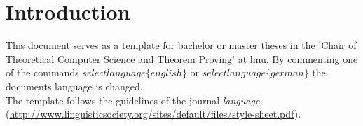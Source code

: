 \documentclass[12pt,letterpaper]{article} %
\begin{document}

\begin{center}
\begin{large}
{}
{}
\end{large}
\end{center}

\vspace{1,5cm}



\newpage
\tableofcontents
\newpage

\setcounter{page}{1}
\pagestyle{fancy}
\fancyhf{}
\fancyhead[R]{\thepage}
\renewcommand{\headrulewidth}{0pt} %

\section{Introduction}
This document serves as a template for bachelor or master theses in the 'Chair of Theoretical Computer Science and Theorem Proving' at \gls{lmu}. 
By commenting one of the commands $selectlanguage\{english\}$ or $selectlanguage\{german\}$ the documents language is changed.
\\The template follows the guidelines of the journal \emph{language} (\url{http://www.linguisticsociety.org/sites/default/files/style-sheet.pdf}).
\end{document}
